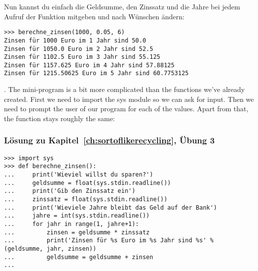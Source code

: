 \noindent
Nun kannst du einfach die Geldsumme, den Zinssatz und die Jahre bei jedem Aufruf der Funktion mitgeben und nach Wünschen ändern:

\begin{Verbatim}[frame=single]
>>> berechne_zinsen(1000, 0.05, 6)
Zinsen für 1000 Euro im 1 Jahr sind 50.0
Zinsen für 1050.0 Euro im 2 Jahr sind 52.5
Zinsen für 1102.5 Euro im 3 Jahr sind 55.125
Zinsen für 1157.625 Euro im 4 Jahr sind 57.88125
Zinsen für 1215.50625 Euro im 5 Jahr sind 60.7753125
\end{Verbatim}


. The mini-program is a bit more complicated than the functions we've already created.  First we need to import the sys module so we can ask for input.  Then we need to prompt the user of our program for each of the values.  Apart from that, the function stays roughly the same:
\subsubsection{Lösung zu Kapitel~\ref{ch:sortoflikerecycling}, Übung 3}

\begin{Verbatim}[frame=single]
>>> import sys
>>> def berechne_zinsen():
...     print('Wieviel willst du sparen?')
...     geldsumme = float(sys.stdin.readline())
...     print('Gib den Zinssatz ein')
...     zinssatz = float(sys.stdin.readline())
...     print('Wieviele Jahre bleibt das Geld auf der Bank')
...     jahre = int(sys.stdin.readline())
...     for jahr in range(1, jahre+1):
...         zinsen = geldsumme * zinssatz
...         print('Zinsen für %s Euro im %s Jahr sind %s' % (geldsumme, jahr, zinsen))
...         geldsumme = geldsumme + zinsen
...
\end{Verbatim}

